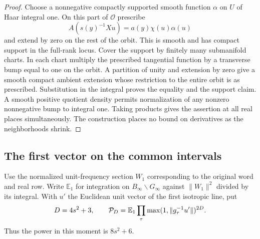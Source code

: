 \documentclass[a4paper,11pt]{article}
\theoremstyle{definition}
\theoremstyle{remark}
\numberwithin{equation}{section}
\begin{document}
\begin{proof}
Choose a nonnegative compactly supported smooth function
\(\alpha\) on \(U\) of Haar integral one. On this part of
\(\mathcal O\) prescribe
\[
             A(s(y)^{-1}Xu)=a(y)\chi(u)\alpha(u)
\]
and extend by zero on the rest of the orbit. This is smooth
and has compact support in the full-rank locus. Cover the
support by finitely many submanifold charts. In each chart
multiply the prescribed tangential function by a transverse
bump equal to one on the orbit. A partition of unity and
extension by zero give a smooth compact ambient extension
whose restriction to the entire orbit is as prescribed.
Substitution in the integral proves the equality and the
support claim. A smooth positive quotient density permits
normalization of any nonzero nonnegative bump to integral one.
Taking products gives the assertion at all real places
simultaneously. The construction places no bound on derivatives
as the neighborhoods shrink.
\end{proof}

\subsection{The first vector on the common intervals}\label{nav:I-65}
Use the normalized unit-frequency section \(W_1\) corresponding
to the original word and real row. Write \(\mathbb E_1\) for
integration on \(B_\infty\backslash G_\infty\) against
\(\|W_1\|^2\) divided by its integral. With \(u'\) the
Euclidean unit vector of the first isotropic line, put
\[
 D=4s^2+3,\qquad
 {\cal P}_D=\mathbb E_1\prod_\tau
                    \max(1,\|g_\tau^{-1}u'\|)^{2D}.
\]
Thus the power in this moment is \(8s^2+6\).
\end{document}
